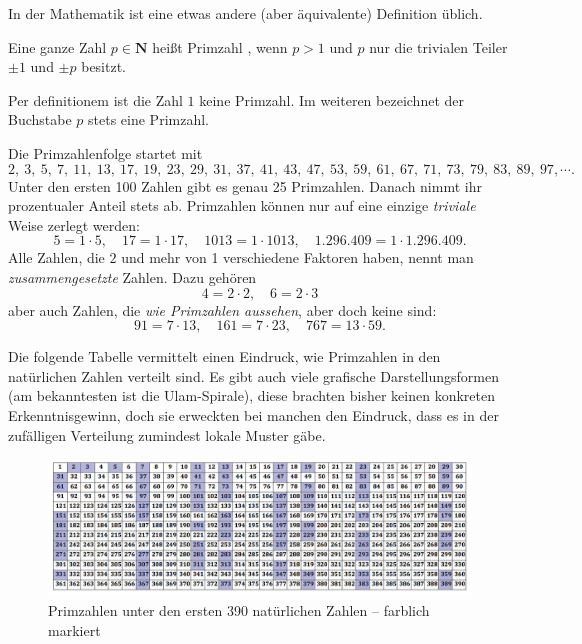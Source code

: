 \begin{refsegment}
In der Mathematik ist eine etwas andere (aber äquivalente) Definition üblich.

\begin{definition}\label{def-pz-prime}
Eine ganze Zahl $p \in \textbf{N}$ heißt Primzahl , wenn $p > 1$ und $p$ nur die trivialen
Teiler $\pm 1$ und $\pm p$ besitzt.
\end{definition}


Per definitionem ist die Zahl $1$ keine Primzahl. Im weiteren bezeichnet der Buchstabe $p$ stets eine Primzahl.

Die Primzahlenfolge startet mit
$$ 2,~ 3,~ 5,~ 7, ~ 11, ~ 13, ~ 17, ~ 19, ~ 23, ~ 29, ~ 31, ~ 37, ~ 41, ~ 43, ~ 47, ~ 53, ~ 59, ~ 61, ~ 67, ~ 71, ~ 73, ~ 79, ~ 83, ~ 89, ~ 97, \cdots .$$
Unter den ersten 100 Zahlen gibt es genau 25 Primzahlen. Danach nimmt ihr prozentualer Anteil stets
ab. Primzahlen können nur auf eine einzige {\em triviale} Weise zerlegt werden:
$$5 = 1 \cdot 5,\quad  17 = 1 \cdot 17, \quad 1013 = 1 \cdot 1013,  \quad 1.296.409 = 1 \cdot 1.296.409.$$
Alle Zahlen, die $2$ und mehr von 1 verschiedene Faktoren haben, nennt man  {\em zusammengesetzte} Zahlen. Dazu gehören
$$ 4 = 2 \cdot 2, \quad 6 = 2\cdot 3 $$
aber auch Zahlen, die {\em wie Primzahlen aussehen}, aber doch keine sind:
$$ 91 = 7 \cdot 13, \quad 161=7 \cdot 23, \quad 767 =13 \cdot 59. $$


Die folgende Tabelle vermittelt einen Eindruck, wie Primzahlen in den natürlichen Zahlen verteilt sind. Es gibt auch viele grafische Darstellungsformen (am bekanntesten ist die Ulam-Spirale), diese brachten bisher keinen konkreten Erkenntnisgewinn, doch sie erweckten bei manchen den Eindruck, dass es in der zufälligen Verteilung zumindest lokale Muster gäbe.

\begin{figure}[!hb]
\begin{center}
\includegraphics[scale=0.3]{figures/Numberrectangle-with-colored-primes_Irisprime.jpg}
\caption[Primzahlen unter den ersten 390 natürlichen Zahlen -- farblich markiert]
        {Primzahlen unter den ersten 390 natürlichen Zahlen -- farblich markiert\protect\footnotemark}
\label{Primes-in-a-390-integer-rechtangle-figure}
\end{center}
\end{figure}


\end{refsegment}
